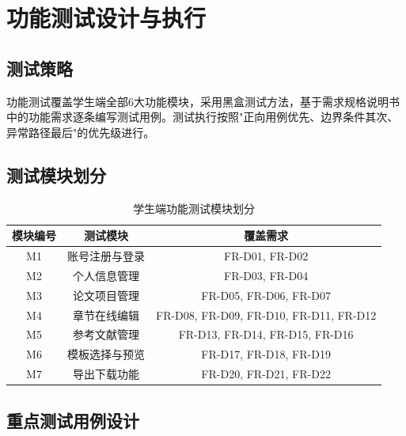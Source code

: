 
\section{功能测试设计与执行}

\subsection{测试策略}

功能测试覆盖学生端全部6大功能模块，采用黑盒测试方法，基于需求规格说明书中的功能需求逐条编写测试用例。测试执行按照"正向用例优先、边界条件其次、异常路径最后"的优先级进行。

\subsection{测试模块划分}

\begin{table}[htbp]
    \centering
    \caption{学生端功能测试模块划分}
    \begin{tabular}{|c|c|c|}
        \hline
        \textbf{模块编号} & \textbf{测试模块} & \textbf{覆盖需求} \\
        \hline
        M1 & 账号注册与登录 & FR-D01, FR-D02 \\
        \hline
        M2 & 个人信息管理 & FR-D03, FR-D04 \\
        \hline
        M3 & 论文项目管理 & FR-D05, FR-D06, FR-D07 \\
        \hline
        M4 & 章节在线编辑 & FR-D08, FR-D09, FR-D10, FR-D11, FR-D12 \\
        \hline
        M5 & 参考文献管理 & FR-D13, FR-D14, FR-D15, FR-D16 \\
        \hline
        M6 & 模板选择与预览 & FR-D17, FR-D18, FR-D19 \\
        \hline
        M7 & 导出下载功能 & FR-D20, FR-D21, FR-D22 \\
        \hline
    \end{tabular}
\end{table}

\subsection{重点测试用例设计}


